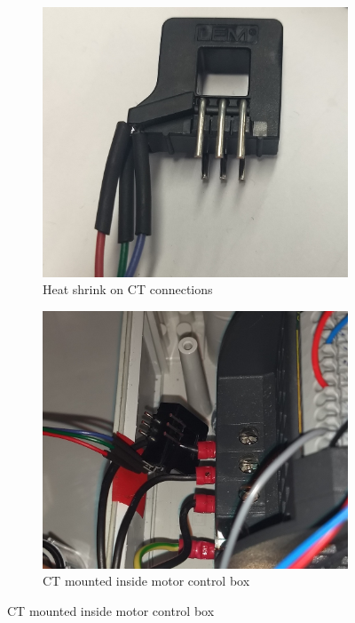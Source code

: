 \begin{figure}
  \centering
  \begin{subfigure}[b]{0.3\linewidth}
    \includegraphics[width=\linewidth]{Images/Current_Sensor.jpg}
    \caption{Heat shrink on CT connections}
  \end{subfigure}
  \begin{subfigure}[b]{0.3\linewidth}
    \includegraphics[width=\linewidth]{Images/CT_Box.jpg}
    \caption{CT mounted inside motor control box}

\end{subfigure}
\end{figure}
